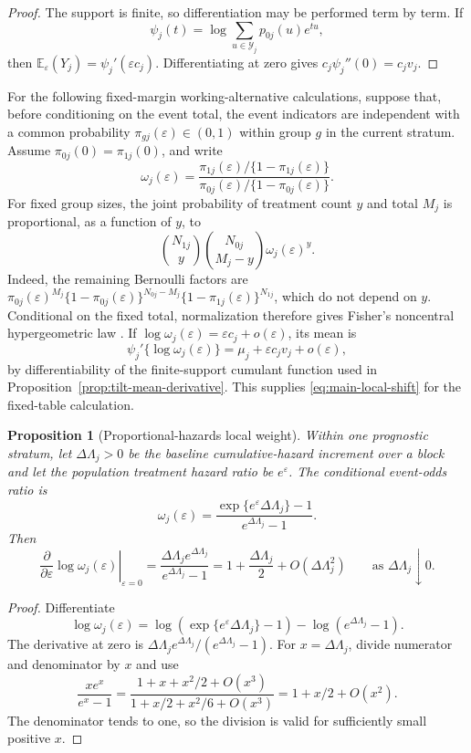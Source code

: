 \documentclass[12pt]{article}
\newtheorem{proposition}[theorem]{Proposition}
\theoremstyle{definition}
\theoremstyle{remark}
\begin{document}
\begin{proof}
The support is finite, so differentiation may be performed term by term. If
\[
 \psi_j(t)=\log\sum_{u\in\mathcal Y_j}p_{0j}(u)e^{tu},
\]
then $\mathbb E_\varepsilon(Y_j)=\psi_j'(\varepsilon c_j)$. Differentiating at zero gives $c_j\psi_j''(0)=c_jv_j$.
\end{proof}

For the following fixed-margin working-alternative calculations, suppose that, before conditioning on the event total, the event indicators are independent with a common probability $\pi_{gj}(\varepsilon)\in(0,1)$ within group $g$ in the current stratum. Assume $\pi_{0j}(0)=\pi_{1j}(0)$, and write
\[
 \omega_j(\varepsilon)
 =\frac{\pi_{1j}(\varepsilon)/\{1-\pi_{1j}(\varepsilon)\}}
        {\pi_{0j}(\varepsilon)/\{1-\pi_{0j}(\varepsilon)\}}.
\]
For fixed group sizes, the joint probability of treatment count $y$ and total $M_j$ is proportional, as a function of $y$, to
\[
 \binom{N_{1j}}{y}\binom{N_{0j}}{M_j-y}
 \omega_j(\varepsilon)^y.
\]
Indeed, the remaining Bernoulli factors are
$\pi_{0j}(\varepsilon)^{M_j}
 \{1-\pi_{0j}(\varepsilon)\}^{N_{0j}-M_j}
 \{1-\pi_{1j}(\varepsilon)\}^{N_{1j}}$,
which do not depend on $y$. Conditional on the fixed total, normalization therefore gives Fisher's noncentral hypergeometric law \citep[Section~3.3 and Appendix~A.3]{TerSchureEtAl2024}. If $\log\omega_j(\varepsilon)=\varepsilon c_j+o(\varepsilon)$, its mean is
\[
 \psi_j'\{\log\omega_j(\varepsilon)\}
 =\mu_j+\varepsilon c_jv_j+o(\varepsilon),
\]
by differentiability of the finite-support cumulant function used in Proposition~\ref{prop:tilt-mean-derivative}. This supplies \eqref{eq:main-local-shift} for the fixed-table calculation.

\begin{proposition}[Proportional-hazards local weight]
Within one prognostic stratum, let $\Delta\Lambda_j>0$ be the baseline cumulative-hazard increment over a block and let the population treatment hazard ratio be $e^\varepsilon$. The conditional event-odds ratio is
\[
 \omega_j(\varepsilon)=
 \frac{\exp\{e^\varepsilon\Delta\Lambda_j\}-1}{e^{\Delta\Lambda_j}-1}.
\]
Then
\[
 \left.\frac{\partial}{\partial\varepsilon}\log\omega_j(\varepsilon)\right|_{\varepsilon=0}
 =\frac{\Delta\Lambda_je^{\Delta\Lambda_j}}{e^{\Delta\Lambda_j}-1}
 =1+\frac{\Delta\Lambda_j}{2}+O\left(\Delta\Lambda_j^2\right)
 \qquad\text{as }\Delta\Lambda_j\downarrow0.
\]
\end{proposition}

\begin{proof}
Differentiate
\[
 \log\omega_j(\varepsilon)
 =\log\left(\exp\{e^\varepsilon\Delta\Lambda_j\}-1\right)
 -\log\left(e^{\Delta\Lambda_j}-1\right).
\]
The derivative at zero is $\Delta\Lambda_je^{\Delta\Lambda_j}/(e^{\Delta\Lambda_j}-1)$. For $x=\Delta\Lambda_j$, divide numerator and denominator by $x$ and use
\[
 \frac{xe^x}{e^x-1}
 =\frac{1+x+x^2/2+O(x^3)}{1+x/2+x^2/6+O(x^3)}
 =1+x/2+O(x^2).
\]
The denominator tends to one, so the division is valid for sufficiently small positive $x$.
\end{proof}
\end{document}
